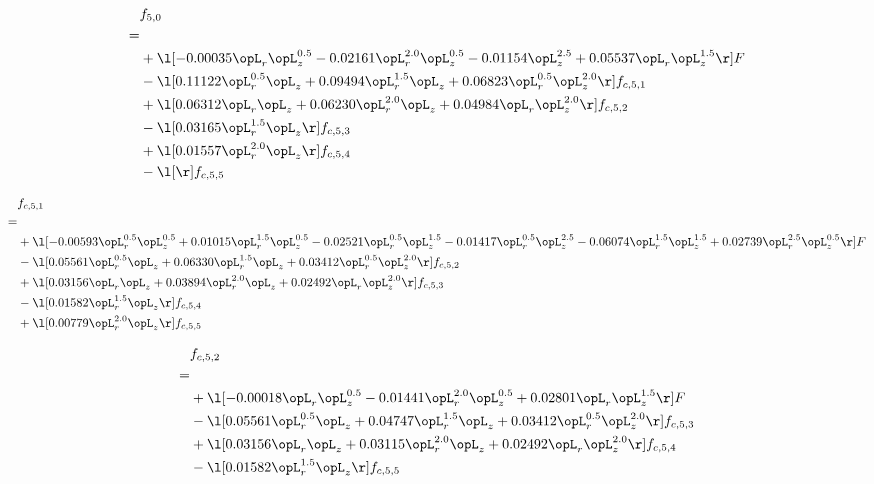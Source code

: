 \begin{alignat}{2} 
\label{eq:f_50_2} 
& f_{5,0} \nonumber \\ 
 = \\ 
& + \l[  -0.00035 \opL_r \opL_z^{0.5}   -0.02161 \opL_r^{2.0} \opL_z^{0.5}   -0.01154 \opL_z^{2.5} +  0.05537 \opL_r \opL_z^{1.5}  \r] F \nonumber \\ 
& - \l[  0.11122 \opL_r^{0.5} \opL_z +  0.09494 \opL_r^{1.5} \opL_z +  0.06823 \opL_r^{0.5} \opL_z^{2.0}  \r] f_{c,5,1} \nonumber \\ 
& + \l[  0.06312 \opL_r \opL_z +  0.06230 \opL_r^{2.0} \opL_z +  0.04984 \opL_r \opL_z^{2.0}  \r] f_{c,5,2} \nonumber \\ 
& - \l[  0.03165 \opL_r^{1.5} \opL_z  \r] f_{c,5,3} \nonumber \\ 
& + \l[  0.01557 \opL_r^{2.0} \opL_z  \r] f_{c,5,4} \nonumber \\ 
& - \l[  \r] f_{c,5,5} \nonumber \\ 
\end{alignat} 


\begin{alignat}{2} 
\label{eq:f_51_2} 
& f_{c,5,1} \nonumber \\ 
 = \\ 
& + \l[  -0.00593 \opL_r^{0.5} \opL_z^{0.5} +  0.01015 \opL_r^{1.5} \opL_z^{0.5}   -0.02521 \opL_r^{0.5} \opL_z^{1.5}   -0.01417 \opL_r^{0.5} \opL_z^{2.5}   -0.06074 \opL_r^{1.5} \opL_z^{1.5} +  0.02739 \opL_r^{2.5} \opL_z^{0.5}  \r] F \nonumber \\ 
& - \l[  0.05561 \opL_r^{0.5} \opL_z +  0.06330 \opL_r^{1.5} \opL_z +  0.03412 \opL_r^{0.5} \opL_z^{2.0}  \r] f_{c,5,2} \nonumber \\ 
& + \l[  0.03156 \opL_r \opL_z +  0.03894 \opL_r^{2.0} \opL_z +  0.02492 \opL_r \opL_z^{2.0}  \r] f_{c,5,3} \nonumber \\ 
& - \l[  0.01582 \opL_r^{1.5} \opL_z  \r] f_{c,5,4} \nonumber \\ 
& + \l[  0.00779 \opL_r^{2.0} \opL_z  \r] f_{c,5,5} \nonumber \\ 
\end{alignat} 


\begin{alignat}{2} 
\label{eq:f_52_2} 
& f_{c,5,2} \nonumber \\ 
 = \\ 
& + \l[  -0.00018 \opL_r \opL_z^{0.5}   -0.01441 \opL_r^{2.0} \opL_z^{0.5} +  0.02801 \opL_r \opL_z^{1.5}  \r] F \nonumber \\ 
& - \l[  0.05561 \opL_r^{0.5} \opL_z +  0.04747 \opL_r^{1.5} \opL_z +  0.03412 \opL_r^{0.5} \opL_z^{2.0}  \r] f_{c,5,3} \nonumber \\ 
& + \l[  0.03156 \opL_r \opL_z +  0.03115 \opL_r^{2.0} \opL_z +  0.02492 \opL_r \opL_z^{2.0}  \r] f_{c,5,4} \nonumber \\ 
& - \l[  0.01582 \opL_r^{1.5} \opL_z  \r] f_{c,5,5} \nonumber \\ 
\end{alignat} 



